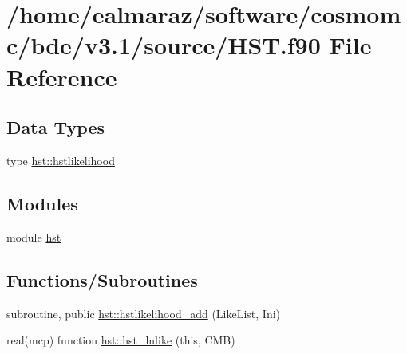 \hypertarget{HST_8f90}{}\section{/home/ealmaraz/software/cosmomc/bde/v3.1/source/\+H\+ST.f90 File Reference}
\label{HST_8f90}
\subsection*{Data Types}
\begin{DoxyCompactItemize}
\item 
type \mbox{\hyperlink{structhst_1_1hstlikelihood}{hst\+::hstlikelihood}}
\end{DoxyCompactItemize}
\subsection*{Modules}
\begin{DoxyCompactItemize}
\item 
module \mbox{\hyperlink{namespacehst}{hst}}
\end{DoxyCompactItemize}
\subsection*{Functions/\+Subroutines}
\begin{DoxyCompactItemize}
\item 
subroutine, public \mbox{\hyperlink{namespacehst_aeb6aaa5b905562155375f8add86df3ec}{hst\+::hstlikelihood\+\_\+add}} (Like\+List, Ini)
\item 
real(mcp) function \mbox{\hyperlink{namespacehst_a25a99c71d60066154487c7394a4b9591}{hst\+::hst\+\_\+lnlike}} (this, C\+MB)
\end{DoxyCompactItemize}
